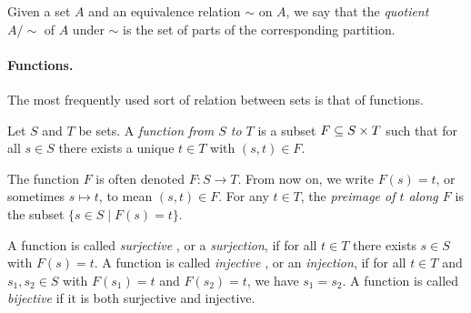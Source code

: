 \documentclass[7Sketches]{subfiles}
\begin{document}
\begin{definition}
\label{def.quotient}
Given a set $A$ and an equivalence relation $\sim$ on $A$, we say that the
\emph{quotient} $A/\sim$ of $A$ under $\sim$ is the set of parts of the
corresponding partition.
\end{definition}


%

\paragraph{Functions.} The most frequently used sort of relation between sets is
that of functions.%

\begin{definition}%
\label{def.function}%
Let $S$ and $T$ be sets. A \emph{function from $S$ to $T$} is a subset $F\ss
S\times T$ such that for all $s\in S$ there exists a unique $t\in T$ with
$(s,t)\in F$.%

The function $F$ is often denoted $F\colon S\to T$. From now on, we write $F(s)=t$, or sometimes $s\mapsto t$, to mean $(s,t)\in F$. For any $t\in T$, the \emph{preimage of $t$ along $F$} is the subset $\{s\in S\mid F(s)=t\}$.%

A function is called \emph{surjective}%
, or a
\emph{surjection}, if
for all $t\in T$
there exists $s\in S$ with $F(s)=t$. A function is called
\emph{injective}%
, or an \emph{injection}, if
for all $t\in T$ and $s_1,s_2\in S$ with
$F(s_1)=t$ and $F(s_2)=t$, we have $s_1=s_2$. A function is called
\emph{bijective}%
 if it is both surjective and
injective.%
%
%
\end{definition}
\end{document}
